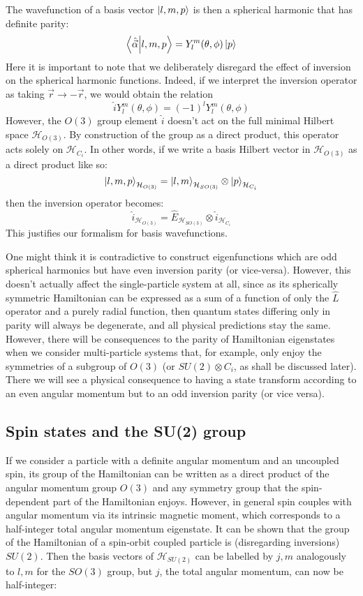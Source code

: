 \documentclass[12pt]{article}
\begin{document}
	The wavefunction of a basis vector $\ket{l,m,p}$ is then a spherical harmonic that has definite parity:
	$$\braket{\hat{\vec{\alpha}}}{l,m,p}=Y_l^m(\theta,\phi)\ket{p}$$
	Here it is important to note that we deliberately disregard the effect of inversion on the spherical harmonic functions. Indeed, if we interpret the inversion operator as taking $\vec{r}\to-\vec{r}$, we would obtain the relation
	$$\hat{i}Y_l^m(\theta,\phi)=(-1)^lY_l^m(\theta,\phi)$$
	However, the $O(3)$ group element $\hat{i}$ doesn't act on the full minimal Hilbert space $\mathcal{H}_{O(3)}$. By construction of the group as a direct product, this operator acts solely on $\mathcal{H}_{C_i}$. In other words, if we write a basis Hilbert vector in $\mathcal{H}_{O(3)}$ as a direct product like so:
	$$\ket{l,m,p}_{\mathcal{H}_{O(3)}}=\ket{l,m}_{\mathcal{H}_{SO(3)}}\otimes \ket{p}_{\mathcal{H}_{C_i}}$$
	then the inversion operator becomes:
	$$\hat{i}_{\mathcal{H}_{O(3)}}=\hat{E}_{\mathcal{H}_{SO(3)}}\otimes \hat{i}_{\mathcal{H}_{C_i}}$$
	This justifies our formalism for basis wavefunctions.
	
	One might think it is contradictive to construct eigenfunctions which are odd spherical harmonics but have even inversion parity (or vice-versa). However, this doesn't actually affect the single-particle system at all, since as its spherically symmetric Hamiltonian can be expressed as a sum of a function of only the $\hat{L}$ operator and a purely radial function, then quantum states differing only in parity will always be degenerate, and all physical predictions stay the same. However, there will be consequences to the parity of Hamiltonian eigenstates when we consider multi-particle systems that, for example, only enjoy the symmetries of a subgroup of $O(3)$ (or $SU(2)\otimes C_i$, as shall be discussed later). There we will see a physical consequence to having a state transform according to an even angular momentum but to an odd inversion parity (or vice versa).
	
	\subsection{Spin states and the SU(2) group}
	
	If we consider a particle with a definite angular momentum and an uncoupled spin, its group of the Hamiltonian can be written as a direct product of the angular momentum group $O(3)$ and any symmetry group that the spin-dependent part of the Hamiltonian enjoys. However, in general spin couples with angular momentum via its intrinsic magnetic moment, which corresponds to a half-integer total angular momentum eigenstate. It can be shown that the group of the Hamiltonian of a spin-orbit coupled particle is (disregarding inversions) $SU(2)$. Then the basis vectors of $\mathcal{H}_{SU(2)}$ can be labelled by $j,m$ analogously to $l,m$ for the $SO(3)$ group, but $j$, the total angular momentum, can now be half-integer:
	
\end{document}
